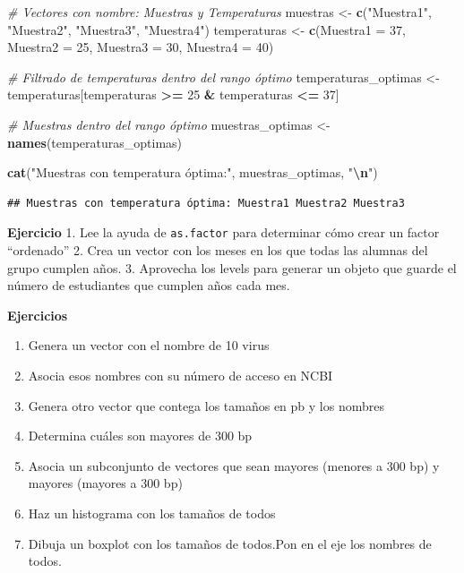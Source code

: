 \documentclass[
]{book}
\newenvironment{Shaded}{\begin{snugshade}}{\end{snugshade}}
\newcommand{\AttributeTok}[1]{\textcolor[rgb]{0.13,0.29,0.53}{#1}}
\newcommand{\CommentTok}[1]{\textcolor[rgb]{0.56,0.35,0.01}{\textit{#1}}}
\newcommand{\DecValTok}[1]{\textcolor[rgb]{0.00,0.00,0.81}{#1}}
\newcommand{\FunctionTok}[1]{\textcolor[rgb]{0.13,0.29,0.53}{\textbf{#1}}}
\newcommand{\NormalTok}[1]{#1}
\newcommand{\OtherTok}[1]{\textcolor[rgb]{0.56,0.35,0.01}{#1}}
\newcommand{\SpecialCharTok}[1]{\textcolor[rgb]{0.81,0.36,0.00}{\textbf{#1}}}
\newcommand{\StringTok}[1]{\textcolor[rgb]{0.31,0.60,0.02}{#1}}
\providecommand{\tightlist}{%
  \setlength{\itemsep}{0pt}\setlength{\parskip}{0pt}}
\begin{document}
\begin{Shaded}
\begin{Highlighting}[]
\CommentTok{\# Vectores con nombre: Muestras y Temperaturas}
\NormalTok{muestras }\OtherTok{\textless{}{-}} \FunctionTok{c}\NormalTok{(}\StringTok{"Muestra1"}\NormalTok{, }\StringTok{"Muestra2"}\NormalTok{, }\StringTok{"Muestra3"}\NormalTok{, }\StringTok{"Muestra4"}\NormalTok{)}
\NormalTok{temperaturas }\OtherTok{\textless{}{-}} \FunctionTok{c}\NormalTok{(}\AttributeTok{Muestra1 =} \DecValTok{37}\NormalTok{, }\AttributeTok{Muestra2 =} \DecValTok{25}\NormalTok{, }\AttributeTok{Muestra3 =} \DecValTok{30}\NormalTok{, }\AttributeTok{Muestra4 =} \DecValTok{40}\NormalTok{)}

\CommentTok{\# Filtrado de temperaturas dentro del rango óptimo}
\NormalTok{temperaturas\_optimas }\OtherTok{\textless{}{-}}\NormalTok{ temperaturas[temperaturas }\SpecialCharTok{\textgreater{}=} \DecValTok{25} \SpecialCharTok{\&}\NormalTok{ temperaturas }\SpecialCharTok{\textless{}=} \DecValTok{37}\NormalTok{]}

\CommentTok{\# Muestras dentro del rango óptimo}
\NormalTok{muestras\_optimas }\OtherTok{\textless{}{-}} \FunctionTok{names}\NormalTok{(temperaturas\_optimas)}

\FunctionTok{cat}\NormalTok{(}\StringTok{"Muestras con temperatura óptima:"}\NormalTok{, muestras\_optimas, }\StringTok{"}\SpecialCharTok{\textbackslash{}n}\StringTok{"}\NormalTok{)}
\end{Highlighting}
\end{Shaded}

\begin{verbatim}
## Muestras con temperatura óptima: Muestra1 Muestra2 Muestra3
\end{verbatim}

\textbf{Ejercicio}
1. Lee la ayuda de \texttt{as.factor} para determinar cómo crear un factor ``ordenado''
2. Crea un vector con los meses en los que todas las alumnas del grupo cumplen años.
3. Aprovecha los levels para generar un objeto que guarde el número de estudiantes que cumplen años cada mes.

\textbf{Ejercicios}

\begin{enumerate}
\def\labelenumi{\arabic{enumi}.}
\tightlist
\item
  Genera un vector con el nombre de 10 virus
\item
  Asocia esos nombres con su número de acceso en NCBI
\item
  Genera otro vector que contega los tamaños en pb y los nombres
\item
  Determina cuáles son mayores de 300 bp
\item
  Asocia un subconjunto de vectores que sean mayores (menores a 300 bp) y mayores (mayores a 300 bp)
\item
  Haz un histograma con los tamaños de todos
\item
  Dibuja un boxplot con los tamaños de todos.Pon en el eje los nombres de todos.
\end{enumerate}
\end{document}
